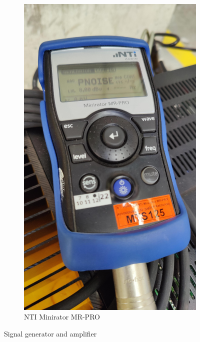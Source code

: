 \begin{figure}[H]
\begin{subfigure}[b]{0.3\textwidth}
         \includegraphics[width=\textwidth]{fig/signal_generator.jpg}
         \caption{NTI Minirator MR-PRO}
     \end{subfigure}
        \caption{Signal generator and amplifier}
        \label{fig:signalgenerator}
\end{figure}

